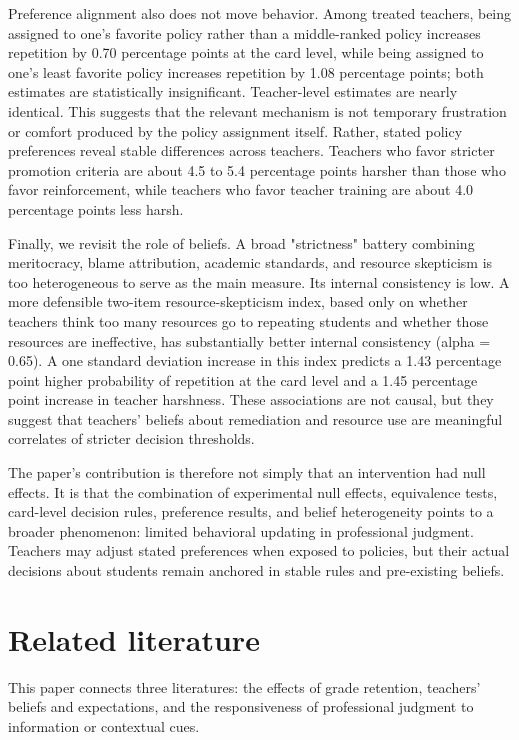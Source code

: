 \documentclass[12pt,a4paper]{article}
\begin{document}
Preference alignment also does not move behavior. Among treated teachers, being assigned to one's favorite policy rather than a middle-ranked policy increases repetition by 0.70 percentage points at the card level, while being assigned to one's least favorite policy increases repetition by 1.08 percentage points; both estimates are statistically insignificant. Teacher-level estimates are nearly identical. This suggests that the relevant mechanism is not temporary frustration or comfort produced by the policy assignment itself. Rather, stated policy preferences reveal stable differences across teachers. Teachers who favor stricter promotion criteria are about 4.5 to 5.4 percentage points harsher than those who favor reinforcement, while teachers who favor teacher training are about 4.0 percentage points less harsh.

Finally, we revisit the role of beliefs. A broad "strictness" battery combining meritocracy, blame attribution, academic standards, and resource skepticism is too heterogeneous to serve as the main measure. Its internal consistency is low. A more defensible two-item resource-skepticism index, based only on whether teachers think too many resources go to repeating students and whether those resources are ineffective, has substantially better internal consistency (alpha = 0.65). A one standard deviation increase in this index predicts a 1.43 percentage point higher probability of repetition at the card level and a 1.45 percentage point increase in teacher harshness. These associations are not causal, but they suggest that teachers' beliefs about remediation and resource use are meaningful correlates of stricter decision thresholds.

The paper's contribution is therefore not simply that an intervention had null effects. It is that the combination of experimental null effects, equivalence tests, card-level decision rules, preference results, and belief heterogeneity points to a broader phenomenon: limited behavioral updating in professional judgment. Teachers may adjust stated preferences when exposed to policies, but their actual decisions about students remain anchored in stable rules and pre-existing beliefs.

\section{Related literature}

This paper connects three literatures: the effects of grade retention, teachers' beliefs and expectations, and the responsiveness of professional judgment to information or contextual cues.
\end{document}
